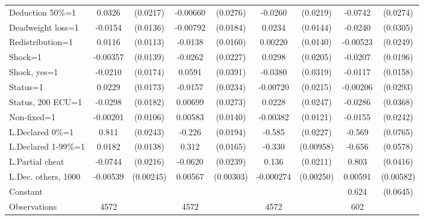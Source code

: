 \begin{tabular}{l|cccccc|cc}
Deduction 50\%=1&   0.0326         & (0.0217)& -0.00660         & (0.0276)&  -0.0260         & (0.0219)&  -0.0742\sym{***}& (0.0274)\\
Deadweight loss=1&  -0.0154         & (0.0136)& -0.00792         & (0.0184)&   0.0234         & (0.0144)&  -0.0240         & (0.0305)\\
Redistribution=1&   0.0116         & (0.0113)&  -0.0138         & (0.0160)&  0.00220         & (0.0140)& -0.00523         & (0.0249)\\
Shock=1         & -0.00357         & (0.0139)&  -0.0262         & (0.0227)&   0.0298         & (0.0205)&  -0.0207         & (0.0196)\\
Shock, yes=1    &  -0.0210         & (0.0174)&   0.0591         & (0.0391)&  -0.0380         & (0.0319)&  -0.0117         & (0.0158)\\
Status=1        &   0.0229         & (0.0173)&  -0.0157         & (0.0234)& -0.00720         & (0.0215)& -0.00206         & (0.0293)\\
Status, 200 ECU=1&  -0.0298         & (0.0182)&  0.00699         & (0.0273)&   0.0228         & (0.0247)&  -0.0286         & (0.0368)\\
Non-fixed=1     & -0.00201         & (0.0106)&  0.00583         & (0.0140)& -0.00382         & (0.0121)&  -0.0155         & (0.0242)\\
L.Declared 0\%=1&    0.811\sym{***}& (0.0243)&   -0.226\sym{***}& (0.0194)&   -0.585\sym{***}& (0.0227)&   -0.569\sym{***}& (0.0765)\\
L.Declared 1-99\%=1&   0.0182         & (0.0138)&    0.312\sym{***}& (0.0165)&   -0.330\sym{***}&(0.00958)&   -0.656\sym{***}& (0.0578)\\
L.Partial cheat &  -0.0744\sym{***}& (0.0216)&  -0.0620\sym{***}& (0.0239)&    0.136\sym{***}& (0.0211)&    0.803\sym{***}& (0.0416)\\
L.Dec. others, 1000& -0.00539\sym{**} &(0.00245)&  0.00567\sym{*}  &(0.00303)&-0.000274         &(0.00250)&  0.00591         &(0.00582)\\
Constant        &                  &         &                  &         &                  &         &    0.624\sym{***}& (0.0645)\\
\hline
Observations    &     4572         &         &     4572         &         &     4572         &         &      602         &         \\


\end{tabular}
